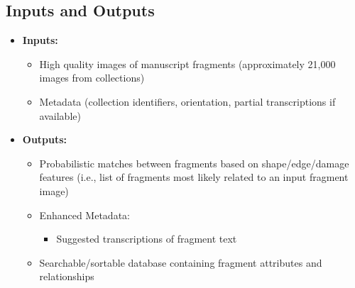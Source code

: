\documentclass{article}
\begin{document}
\subsection{Inputs and Outputs}


\begin{itemize}
  \item \textbf{Inputs:}
    \begin{itemize}
      \item High quality images of manuscript fragments (approximately 21{,}000 images from collections)
      \item Metadata (collection identifiers, orientation, partial transcriptions if available)
    \end{itemize}

  \item \textbf{Outputs:}
    \begin{itemize}
      \item Probabilistic matches between fragments based on shape/edge/damage features (i.e., list of fragments most likely related to an input fragment image)
      \item Enhanced Metadata:
        \begin{itemize}
          \item Suggested transcriptions of fragment text
        \end{itemize}
      \item Searchable/sortable database containing fragment attributes and relationships
    \end{itemize}
\end{itemize}

\end{document}
